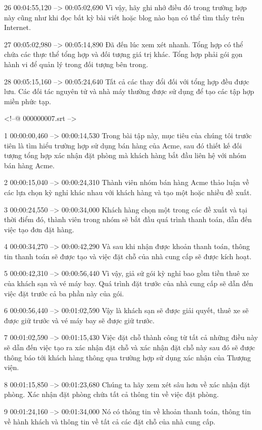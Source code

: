 26
00:04:55,120 --> 00:05:02,690
Vì vậy, hãy ghi nhớ điều đó trong trường hợp này cũng như khi đọc bất kỳ bài viết hoặc blog nào bạn có thể tìm thấy trên Internet.

27
00:05:02,980 --> 00:05:14,890
Đã đến lúc xem xét nhanh.  Tổng hợp có thể chứa các thực thể tổng hợp và đối tượng giá trị khác.  Tổng hợp phải gói gọn hành vi để quản lý trong đối tượng bên trong.

28
00:05:15,160 --> 00:05:24,640
Tất cả các thay đổi đối với tổng hợp đều được lưu.  Các đối tác nguyên tử và nhà máy thường được sử dụng để tạo các tập hợp miền phức tạp.

<!--@ 000000007.srt -->

1
00:00:00,460 --> 00:00:14,530
Trong bài tập này, mục tiêu của chúng tôi trước tiên là tìm hiểu trường hợp sử dụng bán hàng của Acme, sau đó thiết kế đối tượng tổng hợp xác nhận đặt phòng mà khách hàng bắt đầu liên hệ với nhóm bán hàng Acme.

2
00:00:15,040 --> 00:00:24,310
Thành viên nhóm bán hàng Acme thảo luận về các lựa chọn kỳ nghỉ khác nhau với khách hàng và tạo một hoặc nhiều đề xuất.

3
00:00:24,550 --> 00:00:34,000
Khách hàng chọn một trong các đề xuất và tại thời điểm đó, thành viên trong nhóm sẽ bắt đầu quá trình thanh toán, dẫn đến việc tạo đơn đặt hàng.

4
00:00:34,270 --> 00:00:42,290
Và sau khi nhận được khoản thanh toán, thông tin thanh toán sẽ được tạo và việc đặt chỗ của nhà cung cấp sẽ được kích hoạt.

5
00:00:42,310 --> 00:00:56,440
Vì vậy, giả sử gói kỳ nghỉ bao gồm tiền thuê xe của khách sạn và vé máy bay.  Quá trình đặt trước của nhà cung cấp sẽ dẫn đến việc đặt trước cả ba phần này của gói.

6
00:00:56,440 --> 00:01:02,590
Vậy là khách sạn sẽ được giải quyết, thuê xe sẽ được giữ trước và vé máy bay sẽ được giữ trước.

7
00:01:02,590 --> 00:01:15,430
Việc đặt chỗ thành công từ tất cả những điều này sẽ dẫn đến việc tạo ra xác nhận đặt chỗ và xác nhận đặt chỗ này sau đó sẽ được thông báo tới khách hàng thông qua trường hợp sử dụng xác nhận của Thượng viện.

8
00:01:15,850 --> 00:01:23,680
Chúng ta hãy xem xét sâu hơn về xác nhận đặt phòng.  Xác nhận đặt phòng chứa tất cả thông tin về việc đặt phòng.

9
00:01:24,160 --> 00:01:34,000
Nó có thông tin về khoản thanh toán, thông tin về hành khách và thông tin về tất cả các đặt chỗ của nhà cung cấp.

